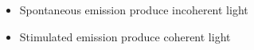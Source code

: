 
\begin{itemize}
	\item Spontaneous emission produce incoherent light
	\item Stimulated emission produce coherent light
\end{itemize}
